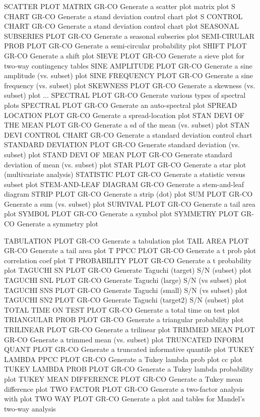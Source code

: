 SCATTER PLOT MATRIX         GR-CO Generate a scatter plot matrix plot
S CHART                     GR-CO Generate a stand deviation control chart plot
S CONTROL CHART             GR-CO Generate a stand deviation control chart plot
SEASONAL SUBSERIES PLOT     GR-CO Generate a seasonal subseries plot
SEMI-CIRULAR PROB PLOT      GR-CO Generate a semi-circular probability plot
SHIFT PLOT                  GR-CO Generate a shift plot
SIEVE PLOT                  GR-CO Generate a sieve plot for two-way contingency tables
SINE AMPLITUDE PLOT         GR-CO Generate a sine amplitude (vs. subset) plot
SINE FREQUENCY PLOT         GR-CO Generate a sine frequency (vs. subset) plot
SKEWNESS PLOT               GR-CO Generate a skewness (vs. subset) plot
... SPECTRAL PLOT           GR-CO Generate various types of spectral plots
SPECTRAL PLOT               GR-CO Generate an auto-spectral plot
SPREAD LOCATION PLOT        GR-CO Generate a spread-location plot
STAN DEVI OF THE MEAN PLOT  GR-CO Generate a sd of the mean (vs. subset) plot
STAN DEVI CONTROL CHART     GR-CO Generate a standard deviation control chart
STANDARD DEVIATION PLOT     GR-CO Generate standard deviation (vs. subset) plot
STAND DEVI OF MEAN PLOT     GR-CO Generate standard deviation of mean (vs. subset) plot
STAR PLOT                   GR-CO Generate a star plot (multivariate analysis)
STATISTIC PLOT              GR-CO Generate a statistic versus subset plot
STEM-AND-LEAF DIAGRAM       GR-CO Generate a stem-and-leaf diagram
STRIP PLOT                  GR-CO Generate a strip (dot) plot
SUM PLOT                    GR-CO Generate a sum (vs. subset) plot
SURVIVAL PLOT               GR-CO Generate a tail area plot
SYMBOL PLOT                 GR-CO Generate a symbol plot
SYMMETRY PLOT               GR-CO Generate a symmetry plot

TABULATION PLOT             GR-CO Generate a tabulation plot
TAIL AREA PLOT              GR-CO Generate a tail area plot
T PPCC PLOT                 GR-CO Generate a t prob plot correlation coef plot
T PROBABILITY PLOT          GR-CO Generate a t probability plot
TAGUCHI SN PLOT             GR-CO Generate Taguchi (target) S/N (subset) plot
TAGUCHI SNL PLOT            GR-CO Generate Taguchi (large) S/N (vs subset) plot
TAGUCHI SNS PLOT            GR-CO Generate Taguchi (small) S/N (vs subset) plot
TAGUCHI SN2 PLOT            GR-CO Generate Taguchi (target2) S/N (subset) plot
TOTAL TIME ON TEST PLOT     GR-CO Generate a total time on test plot
TRIANGULAR PROB PLOT        GR-CO Generate a triangular probability plot
TRILINEAR PLOT              GR-CO Generate a trilinear plot
TRIMMED MEAN PLOT           GR-CO Generate a trimmed mean (vs. subset) plot
TRUNCATED INFORM QUANT PLOT GR-CO Generate a truncated informative quantile plot
TUKEY LAMBDA PPCC PLOT      GR-CO Generate a Tukey lambda prob plot cc plot
TUKEY LAMBDA PROB PLOT      GR-CO Generate a Tukey lambda probability plot
TUKEY MEAN DIFFERENCE PLOT  GR-CO Generate a Tukey mean difference plot
TWO FACTOR PLOT             GR-CO Generate a two-factor analysis with plot
TWO WAY PLOT                GR-CO Generate a plot and tables for Mandel's two-way analysis


